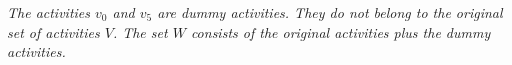 \documentclass{minimal}
\begin{document}
\begin{center}


\vspace{1em}

\emph{The activities $v_0$ and $v_5$ are dummy activities. They do not belong to the original set of activities $V$. The set $W$ consists of the original activities plus the dummy activities. }
\end{center}

\vspace{2cm}

\begin{center}

\end{center}
\end{document}
